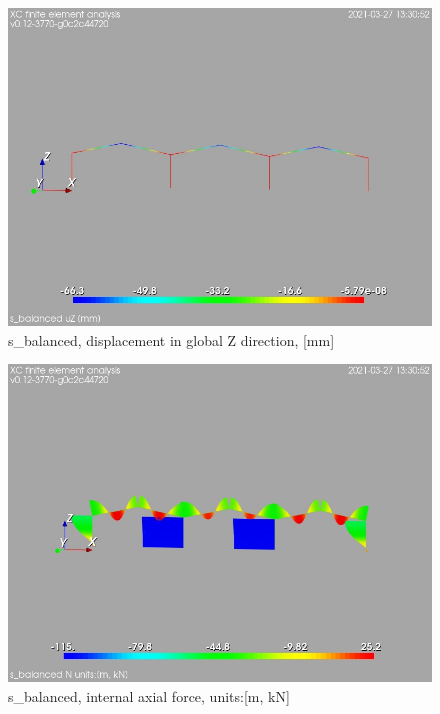 \begin{figure}
\begin{center}
\includegraphics[width=\linewidth]{calc_results/sole_zeinali/text/graphics/resSimplLC/s_balancedtotaluZ}
\caption{s_balanced, displacement in global Z direction, [mm]}
\end{center}
\end{figure}
\begin{figure}
\begin{center}
\includegraphics[width=\linewidth]{calc_results/sole_zeinali/text/graphics/resSimplLC/s_balancedallMemberSetN}
\caption{s_balanced, internal axial force, units:[m, kN]}
\end{center}
\end{figure}
